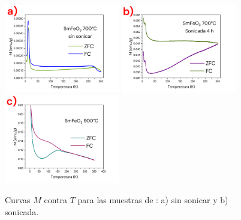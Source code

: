 \documentclass[../main.tex]{subfiles}
\begin{document}
\begin{figure}[H]
    \centering
    \includegraphics[width=0.45\textwidth]{fig/MvTSm.png}
    \quad
    \includegraphics[width=0.45\textwidth]{fig/MvTSm-S.png}
    \includegraphics[width=0.45\textwidth]{fig/MvTSm900.png}
    \caption{Curvas $M$ contra $T$ para las muestras de \sama{}: a) sin sonicar y b) sonicada.}
    \label{fig:MvTSm}
\end{figure}
\end{document}
